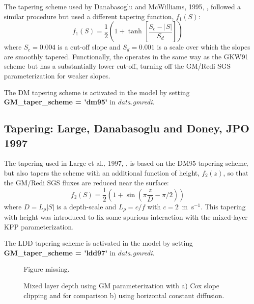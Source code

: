 The tapering scheme used by Danabasoglu and McWilliams, 1995,
\cite{DM95}, followed a similar procedure but used a different
tapering function, $f_1(S)$:
\begin{equation}
f_1(S) = \frac{1}{2} \left( 1+\tanh \left[ \frac{S_c - |S|}{S_d} \right] \right)
\end{equation}
where $S_c = 0.004$ is a cut-off slope and $S_d=0.001$ is a scale over
which the slopes are smoothly tapered. Functionally, the operates in
the same way as the GKW91 scheme but has a substantially lower
cut-off, turning off the GM/Redi SGS parameterization for weaker
slopes.

The DM tapering scheme is activated in the model by setting {\bf
GM\_tap\-er\_scheme = 'dm95'} in {\em data.gmredi}.

\subsection{Tapering: Large, Danabasoglu and Doney, JPO 1997}

The tapering used in Large et al., 1997, \cite{ldd97}, is based on the
DM95 tapering scheme, but also tapers the scheme with an additional
function of height, $f_2(z)$, so that the GM/Redi SGS fluxes are
reduced near the surface:
\begin{equation}
f_2(S) = \frac{1}{2} \left( 1 + \sin(\pi \frac{z}{D} - \pi/2)\right)
\end{equation}
where $D = L_\rho |S|$ is a depth-scale and $L_\rho=c/f$ with
$c=2$~m~s$^{-1}$.  This tapering with height was introduced to fix
some spurious interaction with the mixed-layer KPP parameterization.

The LDD tapering scheme is activated in the model by setting {\bf
GM\_tap\-er\_scheme = 'ldd97'} in {\em data.gmredi}.




\begin{figure}
\begin{center}
Figure missing.
\end{center}
\caption{Mixed layer depth using GM parameterization with a) Cox slope
clipping and for comparison b) using horizontal constant diffusion.}
\label{fig-mixedlayer}
\end{figure}




